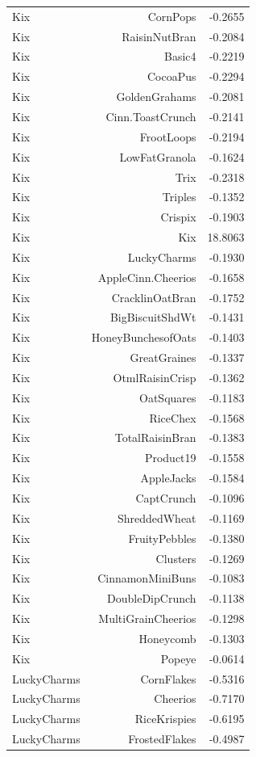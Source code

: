 \begin{longtable}{@{}lrr@{}}
Kix & CornPops & -0.2655 \\
Kix & RaisinNutBran & -0.2084 \\
Kix & Basic4 & -0.2219 \\
Kix & CocoaPus & -0.2294 \\
Kix & GoldenGrahams & -0.2081 \\
Kix & Cinn.ToastCrunch & -0.2141 \\
Kix & FrootLoops & -0.2194 \\
Kix & LowFatGranola & -0.1624 \\
Kix & Trix & -0.2318 \\
Kix & Triples & -0.1352 \\
Kix & Crispix & -0.1903 \\
Kix & Kix & 18.8063 \\
Kix & LuckyCharms & -0.1930 \\
Kix & AppleCinn.Cheerios & -0.1658 \\
Kix & CracklinOatBran & -0.1752 \\
Kix & BigBiscuitShdWt & -0.1431 \\
Kix & HoneyBunchesofOats & -0.1403 \\
Kix & GreatGraines & -0.1337 \\
Kix & OtmlRaisinCrisp & -0.1362 \\
Kix & OatSquares & -0.1183 \\
Kix & RiceChex & -0.1568 \\
Kix & TotalRaisinBran & -0.1383 \\
Kix & Product19 & -0.1558 \\
Kix & AppleJacks & -0.1584 \\
Kix & CaptCrunch & -0.1096 \\
Kix & ShreddedWheat & -0.1169 \\
Kix & FruityPebbles & -0.1380 \\
Kix & Clusters & -0.1269 \\
Kix & CinnamonMiniBuns & -0.1083 \\
Kix & DoubleDipCrunch & -0.1138 \\
Kix & MultiGrainCheerios & -0.1298 \\
Kix & Honeycomb & -0.1303 \\
Kix & Popeye & -0.0614 \\
LuckyCharms & CornFlakes & -0.5316 \\
LuckyCharms & Cheerios & -0.7170 \\
LuckyCharms & RiceKrispies & -0.6195 \\
LuckyCharms & FrostedFlakes & -0.4987 \\

\end{longtable}

